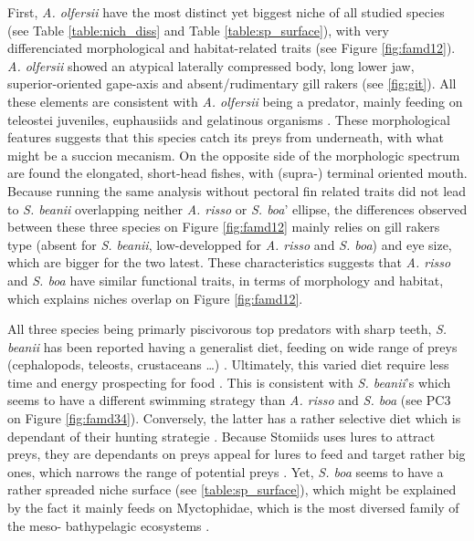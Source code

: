 

First, \textit{A. olfersii} have the most distinct yet biggest niche of all studied species (see Table \ref{table:nich_diss} and Table \ref{table:sp_surface}), with very differenciated morphological and habitat-related traits (see Figure \ref{fig:famd12}). \textit{A. olfersii} showed an atypical laterally compressed body, long lower jaw, superior-oriented gape-axis and absent/rudimentary gill rakers (see \ref{fig:git}). All these elements are consistent with \textit{A. olfersii} being a predator, mainly feeding on teleostei juveniles, euphausiids and gelatinous organisms \citep{eduardo2020}. These morphological features suggests that this species catch its preys from underneath, with what might be a succion mecanism. On the opposite side of the morphologic spectrum are found the elongated, short-head fishes, with (supra-) terminal oriented mouth. Because running the same analysis without pectoral fin related traits did not lead to \textit{S. beanii} overlapping neither \textit{A. risso} or \textit{S. boa}' ellipse, the differences observed between these three species on Figure \ref{fig:famd12} mainly relies on gill rakers type (absent for \textit{S. beanii}, low-developped for \textit{A. risso} and \textit{S. boa}) and eye size, which are bigger for the two latest. These characteristics suggests that \textit{A. risso} and \textit{S. boa} have similar functional traits, in terms of morphology and habitat, which explains niches overlap on Figure \ref{fig:famd12}. 

All three species being primarly piscivorous top predators with sharp teeth, \textit{S. beanii} has been reported having a generalist diet, feeding on wide range of preys (cephalopods, teleosts, crustaceans \ldots{}) \citep{geidner2008}. Ultimately, this varied diet require less time and energy prospecting for food \citep{geidner2008}. This is consistent with \textit{S. beanii}'s which seems to have a different swimming strategy than \textit{A. risso} and \textit{S. boa} (see PC3 on Figure \ref{fig:famd34}). Conversely, the latter has a rather selective diet which is dependant of their hunting strategie \citep{sutton1996}. Because Stomiids uses lures to attract preys, they are dependants on preys appeal for lures to feed and target rather big ones, which narrows the range of potential preys \citep{geidner2008,germain2019}. Yet, \textit{S. boa} seems to have a rather spreaded niche surface (see \ref{table:sp_surface}), which might be explained by the fact it mainly feeds on Myctophidae, which is the most diversed family of the meso- bathypelagic ecosystems \citep{garcia2021,sutton1996}. 

